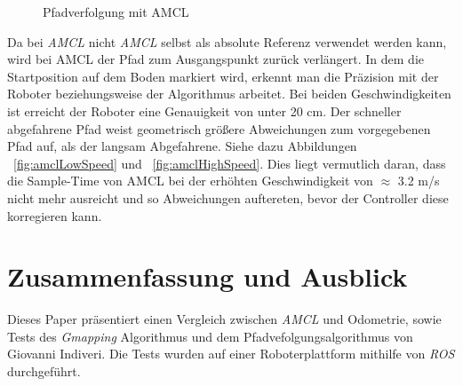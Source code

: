 \documentclass[11pt,a4paper]{article}
\begin{document}
{\begin{figure}[h]
	\centering
	\caption{Pfadverfolgung mit AMCL}
\end{figure}

Da bei \textit{AMCL} nicht \textit{AMCL} selbst als absolute Referenz verwendet werden kann, wird bei AMCL der Pfad zum Ausgangspunkt zur\"uck verl\"angert. In dem die Startposition auf dem Boden markiert wird, erkennt man die Pr\"azision mit der Roboter beziehungsweise der Algorithmus arbeitet.
Bei beiden Geschwindigkeiten ist erreicht der Roboter eine Genauigkeit von unter 20 cm. Der schneller abgefahrene Pfad weist geometrisch gr\"o{\ss}ere Abweichungen zum vorgegebenen Pfad auf, als der langsam Abgefahrene. Siehe dazu Abbildungen ~\ref{fig:amclLowSpeed} und ~\ref{fig:amclHighSpeed}.  
Dies liegt vermutlich daran, dass die Sample-Time von AMCL bei der erh\"ohten Geschwindigkeit  von $\approx$ 3.2 m/s nicht mehr ausreicht und so Abweichungen auftereten, bevor der Controller diese korregieren kann. 

\section{Zusammenfassung und Ausblick}

Dieses Paper pr\"asentiert einen Vergleich zwischen \textit{AMCL} und Odometrie, sowie Tests des \textit{Gmapping} Algorithmus und dem Pfadvefolgungsalgorithmus von Giovanni Indiveri. Die Tests wurden auf einer Roboterplattform mithilfe von \textit{ROS} durchgef\"uhrt. 

}
\end{document}
